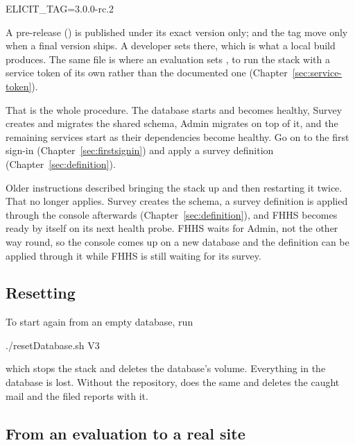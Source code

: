 \documentclass[11pt, a4paper]{article}
\begin{document}
\begin{elicitcmd}
ELICIT_TAG=3.0.0-rc.2
\end{elicitcmd}

A pre-release () is published under its exact version
only;  and the  tag move only when a final version ships. A developer
sets  there, which is what a local build produces. The same file is where an
evaluation sets , to run the stack with a service token of its own
rather than the documented one (Chapter~\ref{sec:service-token}).

That is the whole procedure. The database starts and becomes healthy, Survey creates and
migrates the shared schema, Admin migrates on top of it, and the remaining services start as
their dependencies become healthy. Go on to the first sign-in (Chapter~\ref{sec:firstsignin})
and apply a survey definition (Chapter~\ref{sec:definition}).

\begin{elicitnote}
Older instructions described bringing the stack up and then restarting it twice. That no
longer applies. Survey creates the schema, a survey definition is applied through the console
afterwards (Chapter~\ref{sec:definition}), and FHHS becomes ready by itself on its next
health probe. FHHS waits for Admin, not the other way round, so the console comes up on a
new database and the definition can be applied through it while FHHS is still waiting for
its survey.
\end{elicitnote}

\subsection{Resetting}

To start again from an empty database, run

\begin{elicitcmd}
./resetDatabase.sh V3
\end{elicitcmd}

which stops the stack and deletes the database's volume. Everything in the database is
lost. Without the repository,  does the same and deletes the caught
mail and the filed reports with it.

\subsection{From an evaluation to a real site}
\label{sec:compose-onward}
\end{document}
